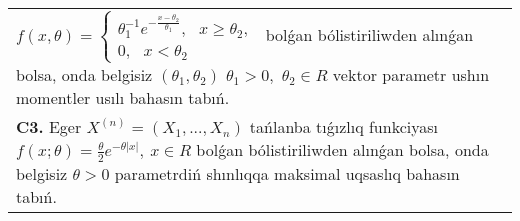\documentclass{article}
\begin{document}
\begin{tabular}{m{17cm}}
$f(x,\theta) = \left\{ \begin{array}{r}
\theta_{1}^{- 1}e^{- \frac{x - \theta_{2}}{\theta_{1}}},\ \ \ x \geq \theta_{2}, \\
0,\ \ \ x < \theta_{2}
\end{array} \right.\ $
bolǵan bólistiriliwden alınǵan bolsa, onda belgisiz \(\left( \theta_{1},\theta_{2} \right)\) \(\theta_{1} > 0,\) \(\theta_{2} \in R\) vektor parametr ushın momentler usılı bahasın tabıń.
 \\
\textbf{C3.} 
Eger \(X^{(n)} = \left( X_{1},...,X_{n} \right)\) tańlanba tıǵızlıq funkciyası
$f(x;\theta) = \frac{\theta}{2}e^{- \theta|x|},\ x \in R$
bolǵan bólistiriliwden alınǵan bolsa, onda belgisiz \(\theta > 0\) parametrdiń shınlıqqa maksimal uqsaslıq bahasın tabıń.
 \\

\end{tabular}
\vspace{1cm}
\end{document}
